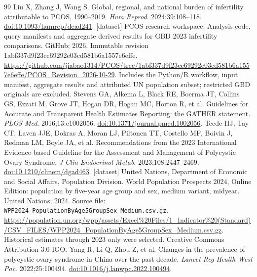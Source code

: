 \documentclass[11pt,a4paper]{article}
\begin{document}
{\begin{thebibliography}{99}
Liu X, Zhang J, Wang S. Global, regional, and national burden of infertility attributable to PCOS, 1990--2019. \emph{Hum Reprod}. 2024;39:108--118. \href{https://doi.org/10.1093/humrep/dead241}{doi:10.1093/humrep/dead241}.
[dataset] PCOS research workspace. Analysis code, query manifests and aggregate derived results for GBD 2023 infertility comparisons. GitHub; 2026. Immutable revision 1abf337d9f23cc69292e03cd581b6a1557e6effe. \url{https://github.com/jiabao1314/PCOS/tree/1abf337d9f23cc69292e03cd581b6a1557e6effe/PCOS_Revision_2026-10-29}. Includes the Python/R workflow, input manifest, aggregate results and attributed UN population subset; restricted GBD originals are excluded.
Stevens GA, Alkema L, Black RE, Boerma JT, Collins GS, Ezzati M, Grove JT, Hogan DR, Hogan MC, Horton R, et al. Guidelines for Accurate and Transparent Health Estimates Reporting: the GATHER statement. \emph{PLOS Med}. 2016;13:e1002056. \href{https://doi.org/10.1371/journal.pmed.1002056}{doi:10.1371/journal.pmed.1002056}.
Teede HJ, Tay CT, Laven JJE, Dokras A, Moran LJ, Piltonen TT, Costello MF, Boivin J, Redman LM, Boyle JA, et al. Recommendations from the 2023 International Evidence-based Guideline for the Assessment and Management of Polycystic Ovary Syndrome. \emph{J Clin Endocrinol Metab}. 2023;108:2447--2469. \href{https://doi.org/10.1210/clinem/dgad463}{doi:10.1210/clinem/dgad463}.
[dataset] United Nations, Department of Economic and Social Affairs, Population Division. World Population Prospects 2024, Online Edition: population by five-year age group and sex, medium variant, midyear. United Nations; 2024. Source file: \texttt{WPP2024\_PopulationByAge5GroupSex\_Medium.csv.gz}. \url{https://population.un.org/wpp/assets/Excel%20Files/1_Indicator%20(Standard)/CSV_FILES/WPP2024_PopulationByAge5GroupSex_Medium.csv.gz}. Historical estimates through 2023 only were selected. Creative Commons Attribution 3.0 IGO.
Yang R, Li Q, Zhou Z, et al. Changes in the prevalence of polycystic ovary syndrome in China over the past decade. \emph{Lancet Reg Health West Pac}. 2022;25:100494. \href{https://doi.org/10.1016/j.lanwpc.2022.100494}{doi:10.1016/j.lanwpc.2022.100494}.
\end{thebibliography}
}
\clearpage
\end{document}
